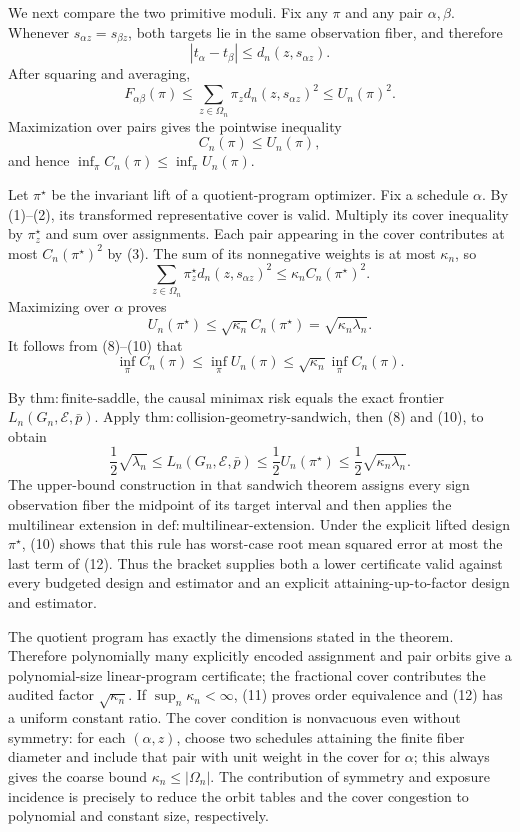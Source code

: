 We next compare the two primitive moduli. Fix any \(\pi\) and any pair \(\alpha,\beta\). Whenever \(s_{\alpha z}=s_{\beta z}\), both targets lie in the same observation fiber, and therefore
\[
 |t_\alpha-t_\beta|
 \le d_n(z,s_{\alpha z}).
\]
After squaring and averaging,
\[
 F_{\alpha\beta}(\pi)
 \le\sum_{z\in\Omega_n}\pi_zd_n(z,s_{\alpha z})^2
 \le U_n(\pi)^2.
\]
Maximization over pairs gives the pointwise inequality
\[
 C_n(\pi)\le U_n(\pi), \tag{9}
\]
and hence \(\inf_\pi C_n(\pi)\le\inf_\pi U_n(\pi)\).

Let \(\pi^\star\) be the invariant lift of a quotient-program optimizer. Fix a schedule \(\alpha\). By (1)--(2), its transformed representative cover is valid. Multiply its cover inequality by \(\pi_z^\star\) and sum over assignments. Each pair appearing in the cover contributes at most \(C_n(\pi^\star)^2\) by (3). The sum of its nonnegative weights is at most \(\kappa_n\), so
\[
 \sum_{z\in\Omega_n}\pi_z^\star d_n(z,s_{\alpha z})^2
 \le\kappa_n C_n(\pi^\star)^2.
\]
Maximizing over \(\alpha\) proves
\[
 U_n(\pi^\star)
 \le\sqrt{\kappa_n}C_n(\pi^\star)
 =\sqrt{\kappa_n\lambda_n}. \tag{10}
\]
It follows from (8)--(10) that
\[
 \inf_\pi C_n(\pi)
 \le\inf_\pi U_n(\pi)
 \le\sqrt{\kappa_n}\inf_\pi C_n(\pi). \tag{11}
\]

By \(\mathrm{thm{:}finite\text{-}saddle}\), the causal minimax risk equals the exact frontier \(L_n(G_n,\mathcal E,\bar p)\). Apply \(\mathrm{thm{:}collision\text{-}geometry\text{-}sandwich}\), then (8) and (10), to obtain
\[
 \frac12\sqrt{\lambda_n}
 \le L_n(G_n,\mathcal E,\bar p)
 \le\frac12U_n(\pi^\star)
 \le\frac12\sqrt{\kappa_n\lambda_n}. \tag{12}
\]
The upper-bound construction in that sandwich theorem assigns every sign observation fiber the midpoint of its target interval and then applies the multilinear extension in \(\mathrm{def{:}multilinear\text{-}extension}\). Under the explicit lifted design \(\pi^\star\), (10) shows that this rule has worst-case root mean squared error at most the last term of (12). Thus the bracket supplies both a lower certificate valid against every budgeted design and estimator and an explicit attaining-up-to-factor design and estimator.

The quotient program has exactly the dimensions stated in the theorem. Therefore polynomially many explicitly encoded assignment and pair orbits give a polynomial-size linear-program certificate; the fractional cover contributes the audited factor \(\sqrt{\kappa_n}\). If \(\sup_n\kappa_n<\infty\), (11) proves order equivalence and (12) has a uniform constant ratio. The cover condition is nonvacuous even without symmetry: for each \((\alpha,z)\), choose two schedules attaining the finite fiber diameter and include that pair with unit weight in the cover for \(\alpha\); this always gives the coarse bound \(\kappa_n\le|\Omega_n|\). The contribution of symmetry and exposure incidence is precisely to reduce the orbit tables and the cover congestion to polynomial and constant size, respectively.


